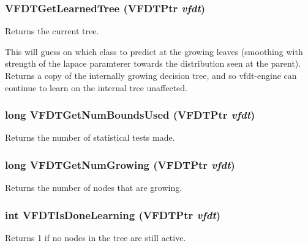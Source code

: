 \subsubsection{ VFDTGet\-Learned\-Tree ({\bf VFDTPtr} {\em vfdt})}\label{vfdt-engine_8h_a24}


Returns the current tree. 

This will guess on which class to predict at the growing leaves (smoothing with strength of the lapace paramterer towards the distribution seen at the parent). Returns a copy of the internally growing decision tree, and so vfdt-engine can continue to learn on the internal tree unaffected. 
\subsubsection{\setlength{\rightskip}{0pt plus 5cm}long VFDTGet\-Num\-Bounds\-Used ({\bf VFDTPtr} {\em vfdt})}\label{vfdt-engine_8h_a22}


Returns the number of statistical tests made. 

\subsubsection{\setlength{\rightskip}{0pt plus 5cm}long VFDTGet\-Num\-Growing ({\bf VFDTPtr} {\em vfdt})}\label{vfdt-engine_8h_a21}


Returns the number of nodes that are growing. 

\subsubsection{\setlength{\rightskip}{0pt plus 5cm}int VFDTIs\-Done\-Learning ({\bf VFDTPtr} {\em vfdt})}\label{vfdt-engine_8h_a20}


Returns 1 if no nodes in the tree are still active. 

